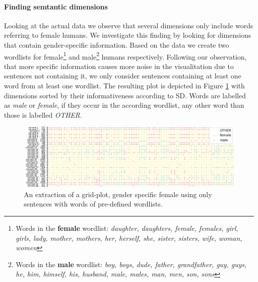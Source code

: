 \paragraph*{Finding semtantic dimensions}
Looking at the actual data we observe that several dimensions only include words referring to female humans. We investigate this finding by looking for dimensions that contain gender-specific information. Based on the data we create two wordlists for female\footnote{Words in the \textbf{female} wordlist: \textit{daughter, daughters, female, females, girl, girls, lady, mother, mothers, her, herself, she, sister, sisters, wife, woman, women}} and male\footnote{Words in the \textbf{male} wordlist: \textit{boy, boys, dude, father, grandfather, guy, guys, he, him, himself, his, husband, male, males, man, men, son, sons}} humans respectively. Following our observation, that more specific information causes more noise in the visualitation due to sentences not containing it, we only consider sentences containing at least one word from at least one wordlist. The resulting plot is depicted in Figure \ref{fig:find_male_female} with dimensions sorted by their informativeness according to \ac{SD}. Words are labelled as \textit{male} or \textit{female}, if they occur in the according wordlist, any other word than those is labelled \textit{OTHER}.
\begin{figure}[tph!]
\centering
	\includegraphics[totalheight=5cm]{fig/findmf.png}
	\caption{An extraction of a grid-plot, gender specific female using only sentences with words of pre-defined wordlists.}
	\label{fig:find_male_female}
\end{figure}
